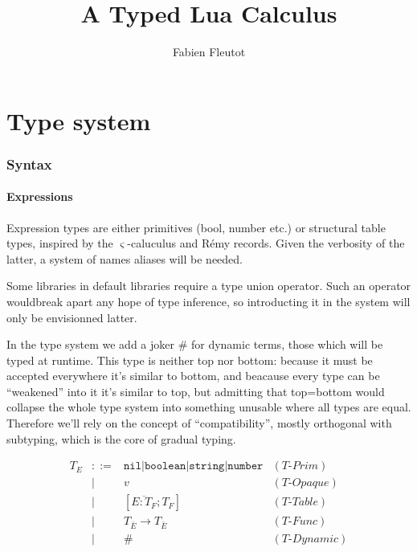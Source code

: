 \documentclass{article}
\title{A Typed Lua Calculus}
\author{Fabien Fleutot}
\newcommand{\eqlabel}[1]{(\textit{#1})}
\begin{document}
\maketitle

\section{Type system}

\subsubsection{Syntax}

\paragraph{Expressions}
Expression types are either primitives (bool, number etc.) or
structural table types, inspired by the $\varsigma$-caluculus and
R\'emy records. Given the verbosity of the latter, a system of names
aliases will be needed.

Some libraries in default libraries require a type union
operator. Such an operator wouldbreak apart any hope of type
inference, so introducting it in the system will only be envisionned
latter.

In the type system we add a joker \# for dynamic terms, those which
will be typed at runtime. This type is neither top nor bottom: because
it must be accepted everywhere it's similar to bottom, and beacause
every type can be ``weakened'' into it it's similar to top, but
admitting that top=bottom would collapse the whole type system into
something unusable where all types are equal. Therefore we'll rely on
the concept of ``compatibility'', mostly orthogonal with subtyping,
which is the core of gradual typing.

\begin{equation}
\begin{array}{rcll}
T_E &::=& \texttt{nil} | \texttt{boolean}
     | \texttt{string} | \texttt{number} & \eqlabel{T-Prim} \\
    &|&   v & \eqlabel{T-Opaque} \\
    &|&   [\overline{E: T_F}; T_F] & \eqlabel{T-Table}\\
    &|&   T_{\bar E} \rightarrow T_{\bar E} & \eqlabel{T-Func} \\
    &|&   \# & \eqlabel{T-Dynamic} \\
\end{array}
\end{equation}
\end{document}
